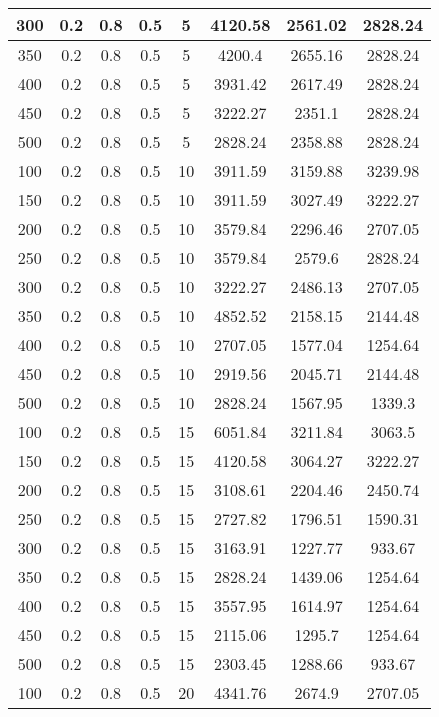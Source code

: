 \documentclass[a4paper, 12pt]{extreport}
\begin{document}
\begin{itemize}
\begin{longtable}{|c|c|c|c|c|c|c|c|}
			300 & 0.2 & 0.8 & 0.5 & 5 & 4120.58 & 2561.02 & 2828.24 \\\hline
			350 & 0.2 & 0.8 & 0.5 & 5 & 4200.4 & 2655.16 & 2828.24 \\\hline
			400 & 0.2 & 0.8 & 0.5 & 5 & 3931.42 & 2617.49 & 2828.24 \\\hline
			450 & 0.2 & 0.8 & 0.5 & 5 & 3222.27 & 2351.1 & 2828.24 \\\hline
			500 & 0.2 & 0.8 & 0.5 & 5 & 2828.24 & 2358.88 & 2828.24 \\\hline
			100 & 0.2 & 0.8 & 0.5 & 10 & 3911.59 & 3159.88 & 3239.98 \\\hline
			150 & 0.2 & 0.8 & 0.5 & 10 & 3911.59 & 3027.49 & 3222.27 \\\hline
			200 & 0.2 & 0.8 & 0.5 & 10 & 3579.84 & 2296.46 & 2707.05 \\\hline
			250 & 0.2 & 0.8 & 0.5 & 10 & 3579.84 & 2579.6 & 2828.24 \\\hline
			300 & 0.2 & 0.8 & 0.5 & 10 & 3222.27 & 2486.13 & 2707.05 \\\hline
			350 & 0.2 & 0.8 & 0.5 & 10 & 4852.52 & 2158.15 & 2144.48 \\\hline
			400 & 0.2 & 0.8 & 0.5 & 10 & 2707.05 & 1577.04 & 1254.64 \\\hline
			450 & 0.2 & 0.8 & 0.5 & 10 & 2919.56 & 2045.71 & 2144.48 \\\hline
			500 & 0.2 & 0.8 & 0.5 & 10 & 2828.24 & 1567.95 & 1339.3 \\\hline
			100 & 0.2 & 0.8 & 0.5 & 15 & 6051.84 & 3211.84 & 3063.5 \\\hline
			150 & 0.2 & 0.8 & 0.5 & 15 & 4120.58 & 3064.27 & 3222.27 \\\hline
			200 & 0.2 & 0.8 & 0.5 & 15 & 3108.61 & 2204.46 & 2450.74 \\\hline
			250 & 0.2 & 0.8 & 0.5 & 15 & 2727.82 & 1796.51 & 1590.31 \\\hline
			300 & 0.2 & 0.8 & 0.5 & 15 & 3163.91 & 1227.77 & 933.67 \\\hline
			350 & 0.2 & 0.8 & 0.5 & 15 & 2828.24 & 1439.06 & 1254.64 \\\hline
			400 & 0.2 & 0.8 & 0.5 & 15 & 3557.95 & 1614.97 & 1254.64 \\\hline
			450 & 0.2 & 0.8 & 0.5 & 15 & 2115.06 & 1295.7 & 1254.64 \\\hline
			500 & 0.2 & 0.8 & 0.5 & 15 & 2303.45 & 1288.66 & 933.67 \\\hline
			100 & 0.2 & 0.8 & 0.5 & 20 & 4341.76 & 2674.9 & 2707.05 \\\hline

\end{longtable}
\end{itemize}
\end{document}
